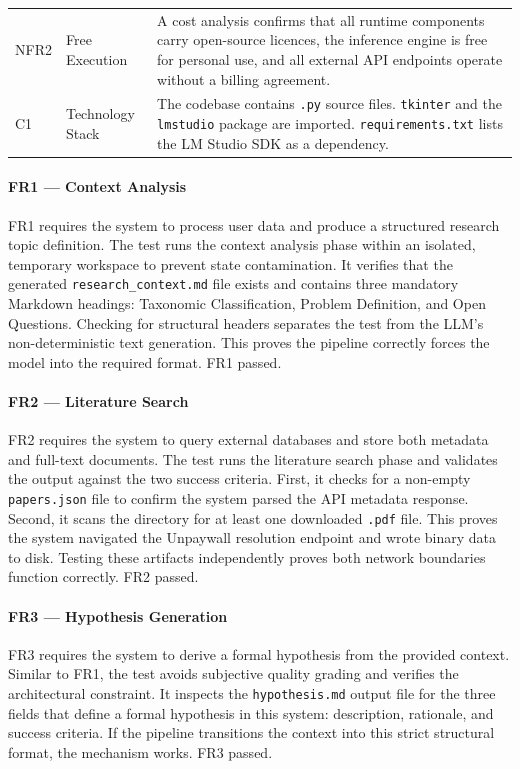 \begin{table}[htbp]
\begin{tabularx}{\textwidth}{l p{2.6cm} X}
        NFR2 & Free \newline Execution & A cost analysis confirms that all runtime components carry open-source licences, the inference engine is free for personal use, and all external API endpoints operate without a billing agreement. \\
        C1 & Technology \newline Stack & The codebase contains \texttt{.py} source files. \texttt{tkinter} and the \texttt{lmstudio} package are imported. \texttt{requirements.txt} lists the LM Studio SDK as a dependency. \\
        \bottomrule
    \end{tabularx}
\end{table}

\paragraph{FR1 — Context Analysis}
FR1 requires the system to process user data and produce a structured research topic definition.
The test runs the context analysis phase within an isolated, temporary workspace to prevent state contamination.
It verifies that the generated \texttt{research\_context.md} file exists and contains three mandatory Markdown headings: Taxonomic Classification, Problem Definition, and Open Questions.
Checking for structural headers separates the test from the LLM's non-deterministic text generation.
This proves the pipeline correctly forces the model into the required format.
FR1 passed.

\paragraph{FR2 — Literature Search}
FR2 requires the system to query external databases and store both metadata and full-text documents.
The test runs the literature search phase and validates the output against the two success criteria.
First, it checks for a non-empty \texttt{papers.json} file to confirm the system parsed the API metadata response.
Second, it scans the directory for at least one downloaded \texttt{.pdf} file.
This proves the system navigated the Unpaywall resolution endpoint and wrote binary data to disk.
Testing these artifacts independently proves both network boundaries function correctly.
FR2 passed.

\paragraph{FR3 — Hypothesis Generation}
FR3 requires the system to derive a formal hypothesis from the provided context.
Similar to FR1, the test avoids subjective quality grading and verifies the architectural constraint.
It inspects the \texttt{hypothesis.md} output file for the three fields that define a formal hypothesis in this system: description, rationale, and success criteria.
If the pipeline transitions the context into this strict structural format, the mechanism works.
FR3 passed.


